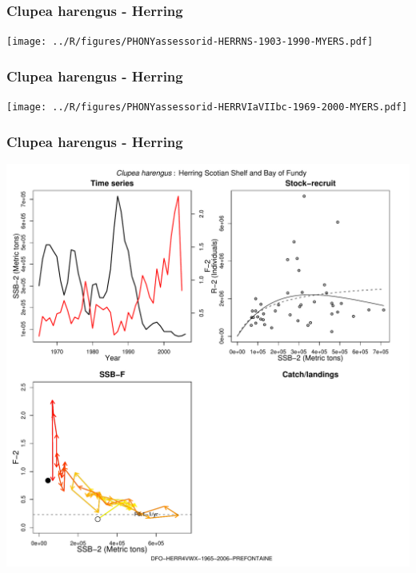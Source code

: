 \subsubsection{Clupea harengus - Herring}
\begin{center}
\texttt{[image: ../R/figures/PHONYassessorid-HERRNS-1903-1990-MYERS.pdf]}
\end{center}

\subsubsection{Clupea harengus - Herring}
\begin{center}
\texttt{[image: ../R/figures/PHONYassessorid-HERRVIaVIIbc-1969-2000-MYERS.pdf]}
\end{center}

\subsubsection{Clupea harengus - Herring}
\begin{center}
\includegraphics[width=1.2\textwidth]{../R/figures/DFO-HERR4VWX-1965-2006-PREFONTAINE.pdf}
\end{center}

